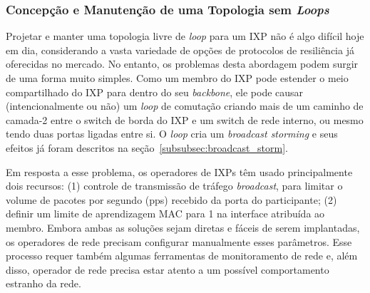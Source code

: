 \documentclass[12pt]{article}
\begin{document}

\subsubsection{Concepção e Manutenção de uma Topologia sem \textit{Loops}}

Projetar e manter uma topologia livre de \textit{loop} para um IXP não é algo difícil hoje em dia, considerando a vasta variedade de opções de protocolos de resiliência já oferecidas no mercado. No entanto, os problemas desta abordagem podem surgir de uma forma muito simples. Como um membro do IXP pode estender o meio compartilhado do IXP para dentro do seu \textit{backbone}, ele pode causar (intencionalmente ou não) um \textit{loop} de comutação criando mais de um caminho de camada-2 entre o switch de borda do IXP e um switch de rede interno, ou mesmo tendo duas portas ligadas entre si. O \textit{loop} cria um \textit{broadcast storming} e seus efeitos já foram descritos na seção~\ref{subsubsec:broadcast_storm}.


Em resposta a esse problema, os operadores de IXPs têm usado principalmente dois recursos: (1) controle de transmissão de tráfego \textit{broadcast}, para limitar o volume de pacotes por segundo (pps) recebido da porta do participante; (2) definir um limite de aprendizagem MAC para 1 na interface atribuída ao membro. Embora ambas as soluções sejam diretas e fáceis de serem implantadas, os operadores de rede precisam configurar manualmente esses parâmetros.  Esse processo requer também algumas ferramentas de monitoramento de rede e, além disso, operador de rede precisa estar atento a um possível comportamento estranho da rede.
\end{document}
